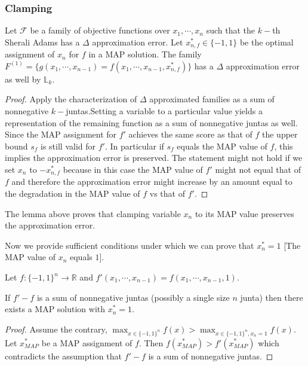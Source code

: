 \subsubsection{Clamping}

\begin{lemma}
Let $\mathcal{F}$ be a family of objective functions over $x_1, \cdots, x_n$ such that the $k-$th Sherali Adams has a $\Delta$ approximation error. Let $x_{n,f}^* \in\{-1,1\}$ be the optimal assignment of $x_n$ for $f$ in a MAP solution. The family $F^{(1)} = \{g(x_1, \cdots, x_{n-1}) = f(x_1, \cdots, x_{n-1},  x_{n,f}^*) \} $ has a $\Delta$ approximation error as well by $\mathbb{L}_k$. 
\end{lemma}

\begin{proof}
Apply the characterization of $\Delta$ approximated families as a sum of nonnegative $k-$juntas.Setting a variable to a particular value yields a representation of the remaining function as a sum of nonnegative juntas as well. Since the MAP assignment for $f'$ achieves the same score as that of $f$ the upper bound $s_f$ is still valid for $f'$. In particular if $s_f$ equals the MAP value of $f$, this implies the approximation error is preserved. The statement might not hold if we set $x_n$ to $-x_{n,f}^*$ because in this case the MAP value of $f'$ might not equal that of $f$ and therefore the approximation error might increase by an amount equal to the degradation in the MAP value of $f$ vs that of $f'$. 
\end{proof}

The lemma above proves that clamping variable $x_n$ to its MAP value preserves the approximation error.

Now we provide sufficient conditions under which we can prove that $x_n^* = 1$ [The MAP value of $x_n$ equals $1$].

Let $f:\{-1,1\}^n\rightarrow \mathbb{R}$ and $f'(x_1, \cdots, x_{n-1}) = f(x_1, \cdots, x_{n-1},1)$. 
\begin{lemma}
If $f'-f$ is a sum of nonnegative juntas (possibly a single size $n$ junta) then there exists a MAP solution with $x_n^* = 1$.
\end{lemma}

\begin{proof}
Assume the contrary, $\max_{x \in \{-1,1\}^n} f(x) > \max_{x\in \{-1,1\}^n, x_n = 1} f(x)$. Let $x_{MAP}^*$ be a MAP assignment of $f$. Then $f(x_{MAP}^*) > f'(x_{MAP}^*)$ which contradicts the assumption that $f'-f$ is a sum of nonnegative juntas.
\end{proof}

